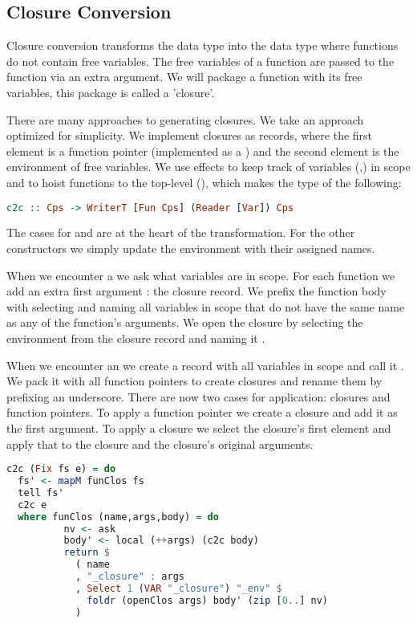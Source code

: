 {\subsection{\label{section:closconvert}Closure Conversion}
Closure conversion transforms the  data type into the  data type where functions do not contain free variables. The free variables of a function are passed to the function via an extra argument. We will package a function with its free variables, this package is called a 'closure'.

There are many approaches to generating closures. We take an approach optimized for simplicity. We implement closures as records, where the first element is a function pointer (implemented as a ) and the second element is the environment of free variables. We use effects to keep track of variables (,) in scope and to hoist functions to the top-level (), which makes the type of  the following:

\begin{lstlisting}[language=Haskell]
c2c :: Cps -> WriterT [Fun Cps] (Reader [Var]) Cps
\end{lstlisting}

The cases for  and  are at the heart of the transformation. For the other constructors we simply update the environment with their assigned names.

When we encounter a  we ask what variables are in scope. For each function we add an extra first argument : the closure record. We prefix the function body with selecting and naming all variables in scope that do not have the same name as any of the function's arguments. We open the closure by selecting the environment from the closure record and naming it .

When we encounter an  we create a record with all variables in scope and call it . We pack it with all function pointers to create closures and rename them by prefixing an underscore. There are now two cases for application: closures and function pointers. To apply a function pointer we create a closure and add it as the first argument. To apply a closure we select the closure's first element and apply that to the closure and the closure's original arguments.

\begin{lstlisting}[language=Haskell]
c2c (Fix fs e) = do
  fs' <- mapM funClos fs
  tell fs'
  c2c e
  where funClos (name,args,body) = do
          nv <- ask
          body' <- local (++args) (c2c body)
          return $
            ( name
            , "_closure" : args
            , Select 1 (VAR "_closure") "_env" $
              foldr (openClos args) body' (zip [0..] nv)
            )


\end{lstlisting}}
